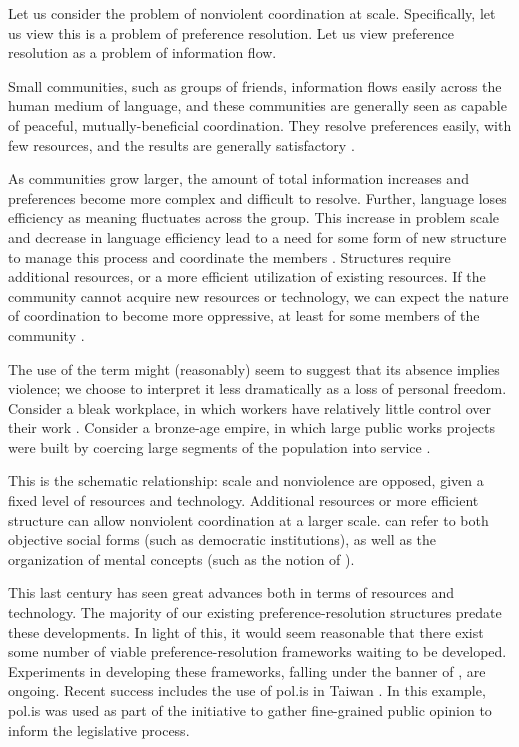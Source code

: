\documentclass[12pt]{book}
\begin{document}
Let us consider the problem of nonviolent coordination at scale.
Specifically, let us view this is a problem of preference resolution.
Let us view preference resolution as a problem of information flow.

Small communities, such as groups of friends, information flows easily across the human medium of language, and these communities are generally seen as capable of peaceful, mutually-beneficial coordination.
They resolve preferences easily, with few resources, and the results are generally satisfactory \cite{deacon}.

As communities grow larger, the amount of total information increases and preferences become more complex and difficult to resolve.
Further, language loses efficiency as meaning fluctuates across the group.
This increase in problem scale and decrease in language efficiency lead to a need for some form of new structure to manage this process and coordinate the members \cite{hobbes}.
Structures require additional resources, or a more efficient utilization of existing resources.
If the community cannot acquire new resources or technology, we can expect the nature of coordination to become more oppressive, at least for some members of the community \cite{eisenberg}.

The use of the term  might (reasonably) seem to suggest that its absence implies violence; we choose to interpret it less dramatically as a loss of personal freedom.
Consider a bleak workplace, in which workers have relatively little control over their work \cite{lin}.
Consider a bronze-age empire, in which large public works projects were built by coercing large segments of the population into service \cite{heilbroner}.

This is the schematic relationship: scale and nonviolence are opposed, given a fixed level of resources and technology.
Additional resources or more efficient structure can allow nonviolent coordination at a larger scale.
 can refer to both objective social forms (such as democratic institutions), as well as the organization of mental concepts (such as the notion of ).

This last century has seen great advances both in terms of resources and technology.
The majority of our existing preference-resolution structures predate these developments.
In light of this, it would seem reasonable that there exist some number of viable preference-resolution frameworks waiting to be developed.
Experiments in developing these frameworks, falling under the banner of , are ongoing.
Recent success includes the use of pol.is in Taiwan \cite{barry}.
In this example, pol.is was used as part of the  initiative to gather fine-grained public opinion to inform the legislative process.
\end{document}

